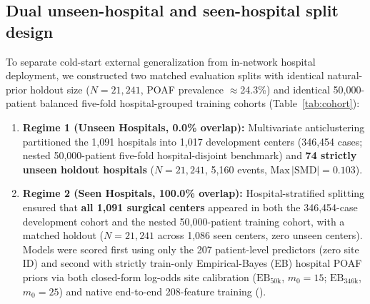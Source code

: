 \subsection{Dual unseen-hospital and seen-hospital split design}
To separate cold-start external generalization from in-network hospital deployment, we constructed two matched evaluation splits with identical natural-prior holdout size ($N{=}21{,}241$, POAF prevalence $\approx$24.3\%) and identical 50,000-patient balanced five-fold hospital-grouped training cohorts (Table~\ref{tab:cohort}):
\begin{enumerate}
  \item \textbf{Regime 1 (Unseen Hospitals, 0.0\% overlap):} Multivariate anticlustering partitioned the 1,091 hospitals into 1,017 development centers (346,454 cases; nested 50,000-patient five-fold hospital-disjoint benchmark) and \textbf{74 strictly unseen holdout hospitals} ($N{=}21{,}241$, 5,160 events, $\mathrm{Max}\,|\mathrm{SMD}|=0.103$).\cite{papenberg2021anticlustering,joseph2022split}
  \item \textbf{Regime 2 (Seen Hospitals, 100.0\% overlap):} Hospital-stratified splitting ensured that \textbf{all 1,091 surgical centers} appeared in both the 346,454-case development cohort and the nested 50,000-patient training cohort, with a matched holdout ($N{=}21{,}241$ across 1,086 seen centers, zero unseen centers). Models were scored first using only the 207 patient-level predictors (zero site ID) and second with strictly train-only Empirical-Bayes (EB) hospital POAF priors via both closed-form log-odds site calibration ($\mathrm{EB}_{50\mathrm{k}}$, $m_0{=}15$; $\mathrm{EB}_{346\mathrm{k}}$, $m_0{=}25$) and native end-to-end 208-feature training ().
\end{enumerate}

